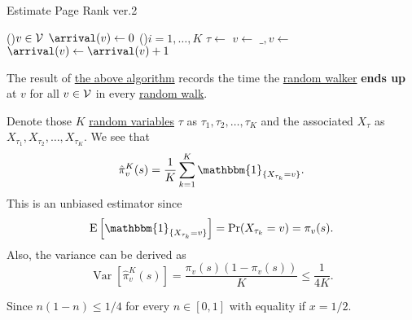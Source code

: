 \begin{algorithm}[H]\label{algo:Monte-Carlo-algorithm-2}
	\DontPrintSemicolon
	\caption{Estimate Page Rank ver.2}

	\BlankLine

	\For(){\(v\in \mathcal{\MakeUppercase{v}} \)}{
		\(\arrival(v)\gets 0\)\;
	}
	\;
	\For(){\(i = 1, \ldots, K\)}{
		\(\tau \gets \) 
		\(v\gets \)
		\(\_, v\gets\)
		\(\arrival(v)\gets \arrival(v) + 1\)
	}
	\Return{\arrival}\;
\end{algorithm}
\begin{note}
	The result of \hyperref[algo:Monte-Carlo-algorithm-2]{the above algorithm} records the time the \hyperref[def:random-walker]{random walker} \textbf{ends up} at \(v\) for all \(v\in \mathcal{\MakeUppercase{v}} \) in every \hyperref[algo:random-walk-algorithm]{random walk}.
\end{note}

Denote those \(K\) \hyperref[def:random-variable]{random variables} \(\tau\) as \(\tau_1, \tau_2, \ldots , \tau_K\) and the associated \(X_{\tau}\) as \(X_{\tau_1}, X_{\tau_2}, \ldots , X_{\tau_K}\). We see that
\[
	\hat{\pi}_v^K(s) = \frac{1}{K}\sum\limits_{k=1}^{K} \mathbbm{1}_{\{X_{\tau_k} = v\}}.
\]
This is an unbiased estimator since
\[
	\mathrm{E}\left[\mathbbm{1}_{\{X_{\tau_k}=v\}}\right] = \Pr(X_{\tau_k} = v) = \pi_v(s).
\]
Also, the variance can be derived as
\[
	\mathop{\mathrm{Var}}\left[\hat{\pi}_v^K(s) \right] = \frac{\pi_v(s)(1 - \pi_v(s))}{K}\leq \frac{1}{4K}.
\]

\begin{remark}
	Since \(n(1-n)\leq 1/4\) for every \(n\in[0, 1]\) with equality if \(x = 1/2\).
\end{remark}

